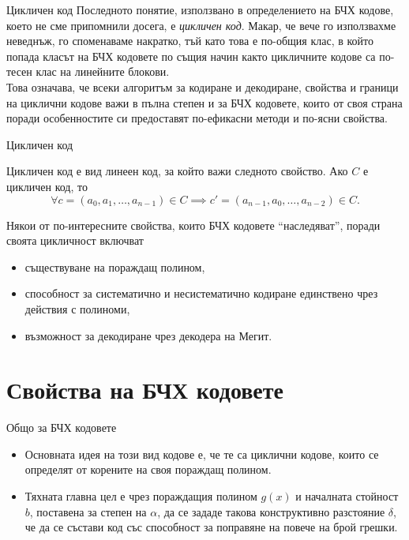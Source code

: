 \documentclass[numbering=fraction]{beamer}
\begin{document}
\begin{frame}{Цикличен код}
Последното понятие, използвано в определението на БЧХ кодове, което не сме
припомнили досега, е \emph{цикличен код}. Макар, че вече го използвахме
неведнъж, го споменаваме накратко, тъй като това е по-общия клас, в който
попада класът на БЧХ кодовете по същия начин както цикличните кодове са по-тесен
клас на линейните блокови. \\
\smallskip
Това означава, че всеки алгоритъм за кодиране и декодиране, свойства и граници на
циклични кодове важи в пълна степен и за БЧХ кодовете, които от своя страна
поради особенностите си предоставят по-ефикасни методи и по-ясни свойства.
\end{frame}

\begin{frame}{Цикличен код}
\begin{definition}
\smallskip
Цикличен код е вид линеен код, за който важи следното свойство. Ако $C$ е
цикличен код, то \[
	\forall c = (a_0, a_1, \dots, a_{n - 1}) \in C
	\implies c' = (a_{n - 1}, a_0, \dots, a_{n - 2}) \in C.
\]
\end{definition}
\smallskip
Някои от по-интересните свойства, които БЧХ кодовете ``наследяват'', поради своята
цикличност включват
\begin{itemize}
	\item съществуване на пораждащ полином,
	\item способност за систематично и несистематично кодиране единствено чрез
	действия с полиноми,
	\item възможност за декодиране чрез декодера на Мегит.
\end{itemize}
\end{frame}

\section{Свойства на БЧХ кодовете}

\begin{frame}{Общо за БЧХ кодовете}
\begin{itemize}
	\item Основната идея на този вид кодове е, че те са циклични кодове, които
	се определят от корените на своя пораждащ полином.
	\item Тяхната главна цел е чрез пораждащия полином $g(x)$ и началната
	стойност $b$, поставена за степен на $\alpha$, да се зададе такова
	конструктивно разстояние $\delta$, че да се състави код със способност за
	поправяне на повече на брой грешки.
\end{itemize}
\end{frame}
\end{document}
